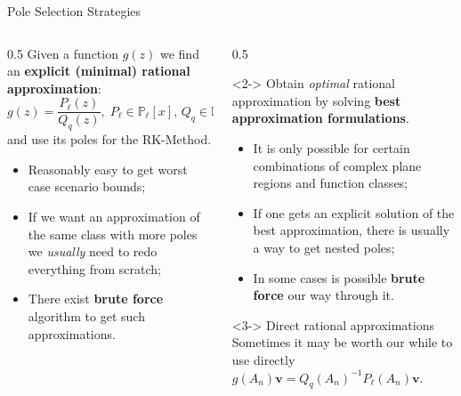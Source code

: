 \documentclass[aspectratio=169,xcolor=dvipsnames]{beamer}
\begin{document}
	\begin{frame}{Pole Selection Strategies}
	\begin{columns}
	\begin{column}{0.5\columnwidth}
	\faDoorOpen\; Given a function $g(z)$ we find an \textbf{explicit (minimal) rational approximation}:
	\[
	g(z) = \frac{P_\ell(z)}{Q_q(z)}, \; P_\ell \in \mathbb{P}_{\ell}[x], \, Q_q \in \mathbb{P}_q[x],
	\]
	and use its poles for the RK-Method.
	\begin{itemize}
	\item[\textcolor{success}{\faCheckCircle}] Reasonably easy to get worst case scenario bounds;
	\item[\alert{\faTimesCircle}] If we want an approximation of the same class with more poles we \emph{usually} need to redo everything from scratch;
	\item[\faHammer] There exist \textbf{brute force} algorithm to get such approximations.
	\end{itemize}
	\end{column}
	\begin{column}{0.5\columnwidth}
	\begin{onlyenv}<2->
	\faDoorOpen\;Obtain \emph{optimal} rational approximation by solving \textbf{best approximation formulations}.
	\begin{itemize}
	\item[\alert{\faTimesCircle}] It is only possible for certain combinations of complex plane regions and function classes;
	\item[\textcolor{success}{\faCheckCircle}] If one gets an explicit solution of the best approximation, there is usually a way to get nested poles;
	\item[\faHammer] In some cases is possible \textbf{brute force} our way through it.
	\end{itemize}
	\end{onlyenv}\vspace{-0.8em}
	\begin{exampleblock}<3->{\faBomb\; Direct rational approximations}
	Sometimes it may be worth our while to use directly $g(A_n)\mathbf{v} = Q_q(A_n)^{-1}P_\ell(A_n)\mathbf{v}$.
	\end{exampleblock}
	\end{column}
	\end{columns}	
		
	\end{frame}
\end{document}
